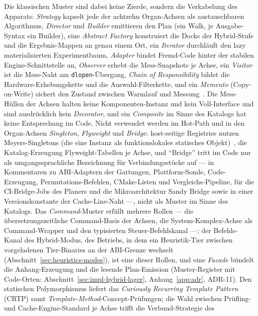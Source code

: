\begin{nurlang}
Die klassischen Muster sind dabei keine Zierde, sondern die Verkabelung des Apparats: \emph{Strategy}
kapselt jede der achtzehn Organ-Achsen als austauschbaren Algorithmus, \emph{Director} und
\emph{Builder} emittieren den Plan (ein Walk, je Ausgabe-Syntax ein Builder), eine \emph{Abstract
Factory} konstruiert die Docks der Hybrid-Stufe und die Ergebnis-Mappen an genau einem Ort, ein
\emph{Iterator} durchläuft den lazy materialisierten Experimentbaum, \emph{Adapter} bindet Fremd-Code
hinter der stabilen Engine-Schnittstelle an, \emph{Observer} erhebt die Mess-Snapshots je Achse, ein
\emph{Visitor} ist die Mess-Naht am \texttt{dlopen}-Übergang, \emph{Chain of Responsibility} bildet die
Hardware-Erhebungskette und die Auswahl-Filterkette, und ein \emph{Memento} (Copy-on-Write) sichert
den Zustand zwischen Warmlauf und Messung~\cite{gamma1994patterns}. Die Mess-Hüllen der Achsen halten
keine Komponenten-Instanz und kein Voll-Interface und sind ausdrücklich kein \emph{Decorator}, und ein
\emph{Composite} im Sinne des Katalogs hat keine Entsprechung im Code. Nicht verwendet werden im Hot-Path
und in den Organ-Achsen \emph{Singleton}, \emph{Flyweight} und \emph{Bridge}: host-seitige Registries
nutzen Meyers-Singletons (die eine Instanz als funktionslokales statisches
Objekt)~\cite{meyers2005effective}, die Katalog-Erzeugung Flyweight-Tabellen je Achse, und
\enquote{Bridge} tritt im Code nur als umgangssprachliche Bezeichnung für Verbindungsstücke auf ---
in Kommentaren zu ABI-Adaptern der Gattungen, Plattform-Sonde, Code-Erzeugung, Permutations-Befehlen,
CMake-Listen und Vergleichs-Pipeline, für die CI-Bridge-Jobs des Planers und die Mikroarchitektur
Sandy Bridge sowie in einer Versionskonstante der Cache-Line-Naht ---, nicht als Muster im Sinne des
Katalogs. Das \emph{Command}-Muster
erfüllt mehrere Rollen --- die übersetzungszeitliche Command-Basis der Achsen, die System-Komplex-Achse
als Command-Wrapper und den typisierten Steuer-Befehlskanal ---; der Befehls-Kanal des Hybrid-Modus,
des Betriebs, in dem ein Heuristik-Tier zwischen vorgeladenen Tier-Binaries an der ABI-Grenze wechselt
(Abschnitt~\ref{sec:heuristics-modes}), ist eine dieser Rollen, und eine \emph{Facade} bündelt die
Anhang-Erzeugung und die lesende Plan-Emission (Muster-Register mit Code-Orten:
Abschnitt~\ref{sec:impl-hybrid-lager}, Anhang~\ref{app:adr}, ADR-11). Den statischen Polymorphismus
liefert das
\emph{Curiously Recurring Template Pattern} (CRTP) samt \emph{Template-Method}-Concept-Prüfungen;
die Wahl zwischen Prüfling- und Cache-Engine-Standard je Achse trifft die Verbund-Strategie des

\end{nurlang}

